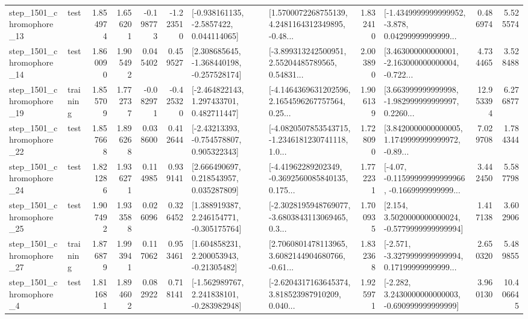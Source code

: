 \begin{tabular}{llrrrrllrlrr}
 step\_1501\_chromophore\_13 &      test &      1.854974 &    1.656201 &     -0.198773 & -1.223510 &     [-0.938161135, -2.5857422, 0.044114065] &  [1.5700072268755139, 4.2481164312349895, -0.48... &       1.832410 &  [-1.4349999999999952, -3.878, 0.04299999999999... &            0.486974 &          5.525574 \\
 step\_1501\_chromophore\_14 &      test &      1.860090 &    1.905492 &      0.045402 &  0.459527 &   [2.308685645, -1.368440198, -0.257528174] &  [-3.899313242500951, 2.55204485789565, 0.54831... &       2.003890 &  [3.463000000000001, -2.163000000000004, -0.722... &            4.734465 &          3.528488 \\
 step\_1501\_chromophore\_19 &  training &      1.855709 &    1.772737 &     -0.082971 & -0.425320 &    [-2.464822143, 1.297433701, 0.482711447] &  [-4.1464369631202596, 2.1654596267757564, 0.25... &       1.906139 &  [3.663999999999998, -1.982999999999997, 0.2260... &           12.953394 &          6.276877 \\
 step\_1501\_chromophore\_22 &      test &      1.857668 &    1.896268 &      0.038600 &  0.412644 &    [-2.43213393, -0.754578807, 0.905322343] &  [-4.0820507853543715, -1.2346181230741118, 1.0... &       1.728090 &  [3.8420000000000005, 1.1749999999999972, -0.89... &            7.029708 &          1.784344 \\
 step\_1501\_chromophore\_24 &      test &      1.821286 &    1.936271 &      0.114985 &  0.939141 &     [2.666490697, 0.218543957, 0.035287809] &  [-4.41962289202349, -0.3692560085840135, 0.175... &       1.772231 &  [-4.07, -0.11599999999999966, -0.1669999999999... &            3.442450 &          5.587798 \\
 step\_1501\_chromophore\_25 &      test &      1.907492 &    1.933588 &      0.026096 &  0.326452 &    [1.388919387, 2.246154771, -0.305175764] &  [-2.3028195948769077, -3.6803843113069465, 0.3... &       1.700935 &   [2.154, 3.5020000000000024, -0.5779999999999994] &            1.417138 &          3.602906 \\
 step\_1501\_chromophore\_27 &  training &      1.876879 &    1.993941 &      0.117062 &  0.953461 &     [1.604858231, 2.200053943, -0.21305482] &  [2.7060801478113965, 3.6082144904680766, -0.61... &       1.832368 &  [-2.571, -3.3279999999999994, 0.17199999999999... &            2.650320 &          5.489855 \\
  step\_1501\_chromophore\_4 &      test &      1.811681 &    1.894602 &      0.082922 &  0.718141 &   [-1.562989767, 2.241838101, -0.283982948] &  [-2.6204317163645374, 3.818523987910209, 0.040... &       1.925971 &   [-2.282, 3.2430000000000003, -0.690999999999999] &            3.960130 &         10.406645 \\

\end{tabular}
